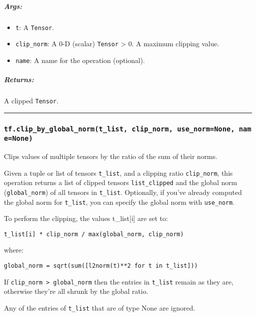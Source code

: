\subparagraph{Args: }\label{args-15}

\begin{itemize}
\tightlist
\item
  \texttt{t}: A \texttt{Tensor}.
\item
  \texttt{clip\_norm}: A 0-D (scalar) \texttt{Tensor} \textgreater{} 0.
  A maximum clipping value.
\item
  \texttt{name}: A name for the operation (optional).
\end{itemize}

\subparagraph{Returns: }\label{returns-9}

A clipped \texttt{Tensor}.

\begin{center}\rule{0.5\linewidth}{\linethickness}\end{center}

\subsubsection{\texorpdfstring{\texttt{tf.clip\_by\_global\_norm(t\_list,\ clip\_norm,\ use\_norm=None,\ name=None)}
}{tf.clip\_by\_global\_norm(t\_list, clip\_norm, use\_norm=None, name=None) }}\label{tf.clipux5fbyux5fglobalux5fnormtux5flist-clipux5fnorm-useux5fnormnone-namenone}

Clips values of multiple tensors by the ratio of the sum of their norms.

Given a tuple or list of tensors \texttt{t\_list}, and a clipping ratio
\texttt{clip\_norm}, this operation returns a list of clipped tensors
\texttt{list\_clipped} and the global norm (\texttt{global\_norm}) of
all tensors in \texttt{t\_list}. Optionally, if you've already computed
the global norm for \texttt{t\_list}, you can specify the global norm
with \texttt{use\_norm}.

To perform the clipping, the values t\_list{[}i{]} are set to:

\texttt{t\_list{[}i{]}\ *\ clip\_norm\ /\ max(global\_norm,\ clip\_norm)}

where:

\texttt{global\_norm\ =\ sqrt(sum({[}l2norm(t)**2\ for\ t\ in\ t\_list{]}))}

If \texttt{clip\_norm\ \textgreater{}\ global\_norm} then the entries in
\texttt{t\_list} remain as they are, otherwise they're all shrunk by the
global ratio.

Any of the entries of \texttt{t\_list} that are of type None are
ignored.

